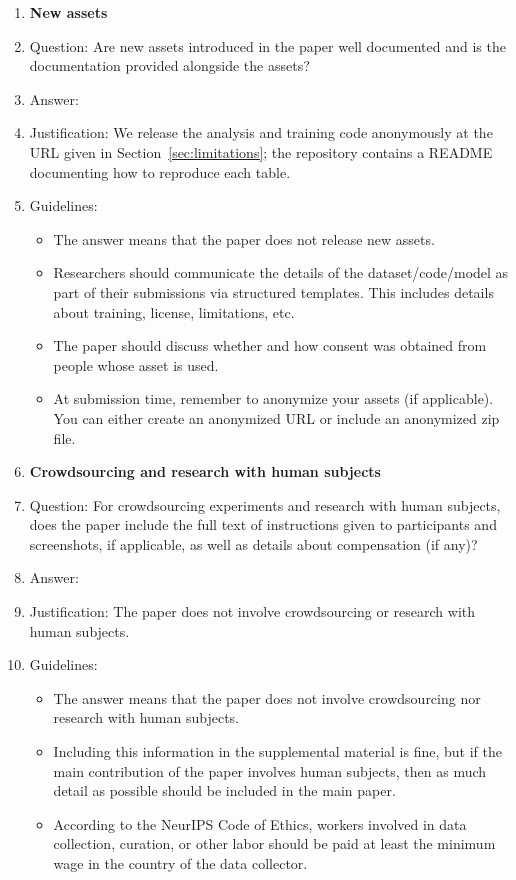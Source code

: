 \documentclass{article}
\begin{document}
\begin{enumerate}
\item {\bf New assets}
    \item[] Question: Are new assets introduced in the paper well documented and is the documentation provided alongside the assets?
    \item[] Answer: \answerYes{}
    \item[] Justification: We release the analysis and training code anonymously at the URL given in Section~\ref{sec:limitations}; the repository contains a README documenting how to reproduce each table.
    \item[] Guidelines:
    \begin{itemize}
        \item The answer \answerNA{} means that the paper does not release new assets.
        \item Researchers should communicate the details of the dataset\slash code\slash model as part of their submissions via structured templates. This includes details about training, license, limitations, etc.
        \item The paper should discuss whether and how consent was obtained from people whose asset is used.
        \item At submission time, remember to anonymize your assets (if applicable). You can either create an anonymized URL or include an anonymized zip file.
    \end{itemize}

\item {\bf Crowdsourcing and research with human subjects}
    \item[] Question: For crowdsourcing experiments and research with human subjects, does the paper include the full text of instructions given to participants and screenshots, if applicable, as well as details about compensation (if any)?
    \item[] Answer: \answerNA{}
    \item[] Justification: The paper does not involve crowdsourcing or research with human subjects.
    \item[] Guidelines:
    \begin{itemize}
        \item The answer \answerNA{} means that the paper does not involve crowdsourcing nor research with human subjects.
        \item Including this information in the supplemental material is fine, but if the main contribution of the paper involves human subjects, then as much detail as possible should be included in the main paper.
        \item According to the NeurIPS Code of Ethics, workers involved in data collection, curation, or other labor should be paid at least the minimum wage in the country of the data collector.
    \end{itemize}


\end{enumerate}
\end{document}
